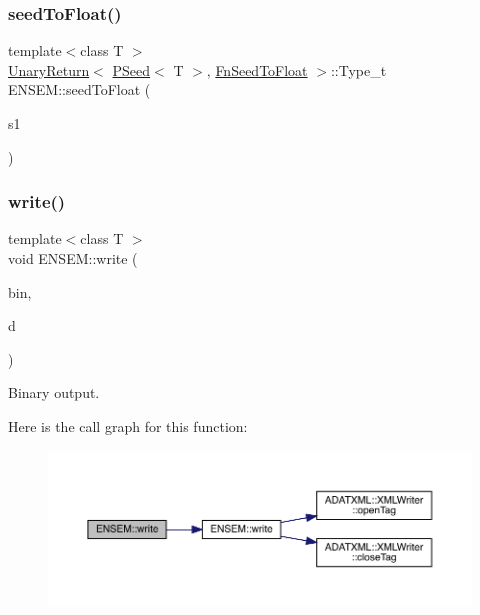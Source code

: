 \subsubsection{\texorpdfstring{seedToFloat()}{seedToFloat()}}
{\footnotesize\ttfamily template$<$class T $>$ \\
\mbox{\hyperlink{structENSEM_1_1UnaryReturn}{Unary\+Return}}$<$ \mbox{\hyperlink{classENSEM_1_1PSeed}{P\+Seed}}$<$ T $>$, \mbox{\hyperlink{structENSEM_1_1FnSeedToFloat}{Fn\+Seed\+To\+Float}} $>$\+::Type\+\_\+t E\+N\+S\+E\+M\+::seed\+To\+Float (\begin{DoxyParamCaption}\item[{const \mbox{\hyperlink{classENSEM_1_1PSeed}{P\+Seed}}$<$ T $>$ \&}]{s1 }\end{DoxyParamCaption})\hspace{0.3cm}{\ttfamily [inline]}}

\mbox{\label{group__primseed_gab778cd144e6a01cdbab68adedc21d456}} 
\subsubsection{\texorpdfstring{write()}{write()}}
{\footnotesize\ttfamily template$<$class T $>$ \\
void E\+N\+S\+E\+M\+::write (\begin{DoxyParamCaption}\item[{\mbox{\hyperlink{classADATIO_1_1BinaryWriter}{A\+D\+A\+T\+I\+O\+::\+Binary\+Writer}} \&}]{bin,  }\item[{const \mbox{\hyperlink{classENSEM_1_1PSeed}{P\+Seed}}$<$ T $>$ \&}]{d }\end{DoxyParamCaption})\hspace{0.3cm}{\ttfamily [inline]}}



Binary output. 

Here is the call graph for this function\+:\nopagebreak
\begin{figure}[H]
\begin{center}
\leavevmode
\includegraphics[width=350pt]{df/d3c/group__primseed_gab778cd144e6a01cdbab68adedc21d456_cgraph}
\end{center}
\end{figure}
\mbox{\label{group__primseed_ga7f820f9e98c02626f49ea005894fdc65}} 
